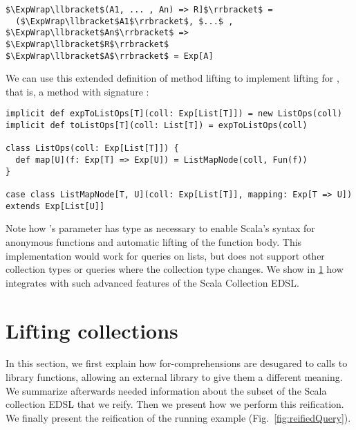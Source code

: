 \begin{lstlisting}
$\ExpWrap\llbracket$(A1, ... , An) => R]$\rrbracket$ =
  ($\ExpWrap\llbracket$A1$\rrbracket$, $...$ , $\ExpWrap\llbracket$An$\rrbracket$ => $\ExpWrap\llbracket$R$\rrbracket$
$\ExpWrap\llbracket$A$\rrbracket$ = Exp[A]
\end{lstlisting}

We can use this extended definition of method lifting to  implement  lifting for , that is, a method with signature :

\begin{lstlisting}
implicit def expToListOps[T](coll: Exp[List[T]]) = new ListOps(coll)
implicit def toListOps[T](coll: List[T]) = expToListOps(coll)

class ListOps(coll: Exp[List[T]]) {
  def map[U](f: Exp[T] => Exp[U]) = ListMapNode(coll, Fun(f))
}

case class ListMapNode[T, U](coll: Exp[List[T]], mapping: Exp[T => U]) extends Exp[List[U]]
\end{lstlisting}

Note how 's parameter  has type  as necessary to enable Scala's syntax for anonymous functions and automatic lifting of the function body. This implementation would work for queries on lists, but does not support other collection types or queries where the collection type changes. We show in \cref{subsec:collections} how {\LoS} integrates with such advanced features of the Scala Collection EDSL\@.


\section{Lifting collections}
\label{subsec:collections}
In this section, we first explain how for-comprehensions are desugared to calls to library functions, allowing an external library to give them a different meaning. We summarize afterwards needed information about the subset of the Scala collection EDSL that we reify. Then we present how we perform this reification.
We finally present the reification of the running example (Fig.~\ref{fig:reifiedQuery}).

